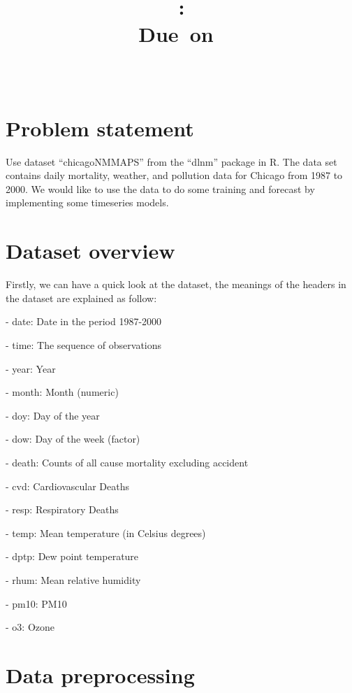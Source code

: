 \documentclass{article}
\title{
    \vspace{2in}
    \textmd{\textbf{\hmwkClass: \hmwkTitle}}\\
    \normalsize\vspace{0.1in}\small{Due\ on\ \hmwkDueDate}\\
    \vspace{0.1in}\large{\textit{\hmwkClassInstructor\ \hmwkClassTime}}
    \vspace{3in}
}
\author{\textbf{\hmwkAuthorName}}
\date{}
\begin{document}
\maketitle
\thispagestyle{empty}
\pagebreak
\thispagestyle{empty}
\tableofcontents

\newpage
\setcounter{page}{1}
\section{Problem statement}
Use dataset “chicagoNMMAPS” from the “dlnm” package in R. The data set contains daily mortality, weather, and pollution data for Chicago from 1987 to 2000. 
We would like to use the data to do some training and forecast by implementing some timeseries models.
\vspace{4pt}
\section{Dataset overview}

Firstly, we can have a quick look at the dataset, the meanings of the headers in the dataset are explained as follow:

    \quad - date: Date in the period 1987-2000

    \quad - time: The sequence of observations

    \quad - year: Year

    \quad - month: Month (numeric)

    \quad - doy: Day of the year

    \quad - dow: Day of the week (factor)

    \quad - death: Counts of all cause mortality excluding accident

    \quad - cvd: Cardiovascular Deaths

    \quad - resp: Respiratory Deaths

    \quad - temp: Mean temperature (in Celsius degrees)

    \quad - dptp: Dew point temperature

    \quad - rhum: Mean relative humidity

    \quad - pm10: PM10

    \quad - o3: Ozone

\vspace{4pt}
\section{Data preprocessing}
\end{document}
